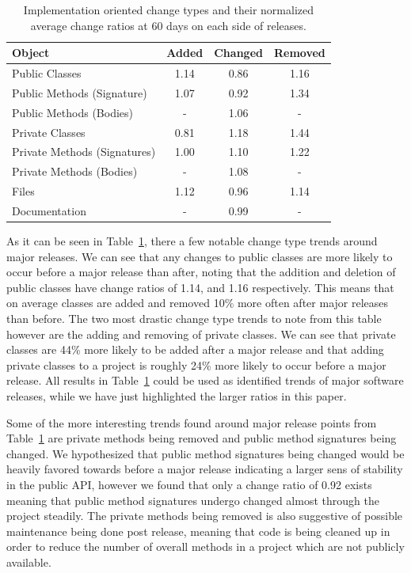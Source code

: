 \documentclass[conference]{IEEEtran}
\begin{document}
\begin{table}[h]
\begin{center}
\tabcolsep=0.11cm
\begin{tabular}{| l | c | c | c |}
\hline
Object & Added & Changed & Removed\\
\hline
Public Classes & 1.14 & 0.86 & 1.16 \\
Public Methods (Signature) & 1.07 & 0.92 & 1.34 \\
Public Methods (Bodies) & - & 1.06 & - \\
Private Classes & 0.81 & 1.18 & 1.44 \\
Private Methods (Signatures) & 1.00 & 1.10 & 1.22 \\
Private Methods (Bodies) & - & 1.08 & - \\
Files & 1.12 & 0.96 & 1.14 \\
Documentation & - & 0.99 & - \\
\hline
\end{tabular}
\end{center}
\caption{Implementation oriented change types and their normalized average change ratios at 60 days on each side of releases. \label{tab:ratio}}
\end{table}

As it can be seen in Table~\ref{tab:ratio}, there a few notable change type trends around major releases. We can see that any changes to public classes are
more likely to occur before a major release than after, noting that the addition and deletion of public classes have change ratios of 1.14, 
and 1.16 respectively. This means that on average classes are added and removed 10\% more often after major releases than before.
The two most drastic change type trends to note from this table however are the adding and removing of private classes. We can see that private classes are
44\% more likely to be added after a major release and that adding private classes to a project is roughly 24\% more likely to occur before a major release.
All results in Table~\ref{tab:ratio} could be used as identified trends of major software releases, while we have just highlighted the larger ratios in
this paper.

Some of the more interesting trends found around major release points from Table~\ref{tab:ratio} are private methods being removed and public method signatures
being changed. We hypothesized that public method signatures being changed would be heavily favored towards before a major release indicating a larger sens
of stability in the public API, however we found that only a change ratio of 0.92 exists meaning that public method signatures undergo changed almost through
the project steadily. The private methods being removed is also suggestive of possible maintenance being done post release, meaning that code is being
cleaned up in order to reduce the number of overall methods in a project which are not publicly available.
\end{document}
